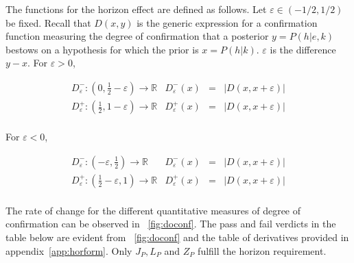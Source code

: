 \documentclass[phd,12pt,oneside]{ubcthesis}
\begin{document}
The functions for the horizon effect are defined as follows. Let
$\varepsilon\in{}(-1/2,1/2)$ be fixed. Recall that $D(x,y)$ is the
generic expression for a confirmation function measuring the degree of
confirmation that a posterior $y=P(h|e,k)$ bestows on a hypothesis for
which the prior is $x=P(h|k)$. $\varepsilon$ is the difference $y-x$.
For $\varepsilon>0$,

\begin{equation}
  \begin{array}{lrcl}
  D_{\varepsilon}^{-}:(0,\frac{1}{2}-\varepsilon)\rightarrow{}\mathbb{R} & D_{\varepsilon}^{-}(x)&=&|D(x,x+\varepsilon)| \\
  D_{\varepsilon}^{+}:(\frac{1}{2},1-\varepsilon)\rightarrow{}\mathbb{R} & D_{\varepsilon}^{+}(x)&=&|D(x,x+\varepsilon)| \\
  \end{array}
  \label{eq:defdhpos}
\end{equation}

{\noindent}For $\varepsilon<0$,

\begin{equation}
  \begin{array}{lrcl}
  D_{\varepsilon}^{-}:(-\varepsilon,\frac{1}{2})\rightarrow{}\mathbb{R} & D_{\varepsilon}^{-}(x)&=&|D(x,x+\varepsilon)| \\
  D_{\varepsilon}^{+}:(\frac{1}{2}-\varepsilon,1)\rightarrow{}\mathbb{R} & D_{\varepsilon}^{+}(x)&=&|D(x,x+\varepsilon)| \\
  \end{array}
  \label{eq:defdhneg}
\end{equation}

The rate of change for the different quantitative measures of degree
of confirmation can be observed in {\igure}~\ref{fig:doconf}. The pass
and fail verdicts in the table below are evident from
{\igure}~\ref{fig:doconf} and the table of derivatives provided in
appendix~\ref{app:horform}. Only $J_{P},L_{P}$ and $Z_{P}$ fulfill the
horizon requirement.
\end{document}
